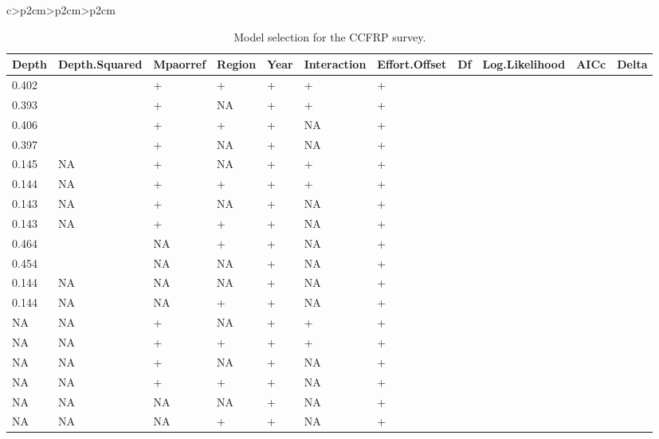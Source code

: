 \documentclass[11pt,
  letterpaper,
]{article}
\begin{document}
\begin{longtable}[t]{c>{\centering\arraybackslash}p{2cm}>{\centering\arraybackslash}p{2cm}>{\centering\arraybackslash}p{2cm}}
\begin{landscape}\begin{table}[H]
\centering
\caption{\label{tab:ccfrp-model-selection}Model selection for the CCFRP survey.}
\centering
\fontsize{7}{9}\selectfont
\fontsize{7}{9}\selectfont
\begin{tabular}[t]{l>{\raggedright\arraybackslash}p{1cm}>{\raggedright\arraybackslash}p{1cm}>{\raggedright\arraybackslash}p{1cm}>{\raggedright\arraybackslash}p{1cm}>{\raggedright\arraybackslash}p{1cm}>{\raggedright\arraybackslash}p{1cm}>{\raggedright\arraybackslash}p{1cm}>{\raggedright\arraybackslash}p{1cm}>{\raggedright\arraybackslash}p{1cm}>{\raggedright\arraybackslash}p{1cm}}
\toprule
Depth & Depth.Squared & Mpaorref & Region & Year & Interaction & Effort.Offset & Df & Log.Likelihood & AICc & Delta\\
\midrule
0.402 & -0.008 & + & + & + & + & + & 36 & -5319.3 & 10710.9 & 0.0\\
0.393 & -0.008 & + & NA & + & + & + & 35 & -5321.0 & 10712.3 & 1.4\\
0.406 & -0.008 & + & + & + & NA & + & 21 & -5351.1 & 10744.4 & 33.5\\
0.397 & -0.008 & + & NA & + & NA & + & 20 & -5353.0 & 10746.1 & 35.2\\
0.145 & NA & + & NA & + & + & + & 34 & -5350.2 & 10768.8 & 57.9\\
0.144 & NA & + & + & + & + & + & 35 & -5350.1 & 10770.5 & 59.6\\
0.143 & NA & + & NA & + & NA & + & 19 & -5383.4 & 10804.9 & 94.0\\
0.143 & NA & + & + & + & NA & + & 20 & -5383.2 & 10806.5 & 95.6\\
0.464 & -0.010 & NA & + & + & NA & + & 20 & -5508.1 & 11056.3 & 345.4\\
0.454 & -0.010 & NA & NA & + & NA & + & 19 & -5510.5 & 11059.2 & 348.3\\
0.144 & NA & NA & NA & + & NA & + & 18 & -5554.0 & 11144.1 & 433.2\\
0.144 & NA & NA & + & + & NA & + & 19 & -5553.8 & 11145.6 & 434.7\\
NA & NA & + & NA & + & + & + & 33 & -5632.6 & 11331.5 & 620.6\\
NA & NA & + & + & + & + & + & 34 & -5632.2 & 11332.7 & 621.8\\
NA & NA & + & NA & + & NA & + & 18 & -5661.2 & 11358.4 & 647.5\\
NA & NA & + & + & + & NA & + & 19 & -5660.7 & 11359.5 & 648.6\\
NA & NA & NA & NA & + & NA & + & 17 & -5815.9 & 11665.8 & 954.9\\
NA & NA & NA & + & + & NA & + & 18 & -5815.3 & 11666.8 & 955.9\\
\bottomrule
\end{tabular}
\end{table}
\end{landscape}


\end{longtable}
\end{document}
